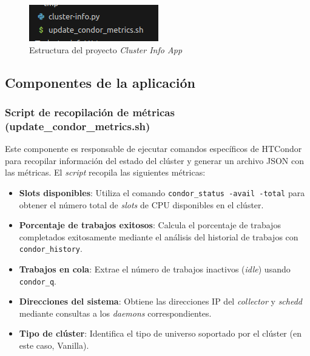 \begin{figure}[H]
	\centering
	\includegraphics[scale=0.7]{tablas-images/pmv/estructura-proyecto-cluster-info-app.png}
	\caption{Estructura del proyecto \textit{Cluster Info App}}
	\label{fig:estructura-proyecto-cluster-info-app}
\end{figure}

\subsection{Componentes de la aplicación}
\noindent

\subsubsection{Script de recopilación de métricas (update\_condor\_metrics.sh)}
\noindent

Este componente es responsable de ejecutar comandos específicos de HTCondor para recopilar información del estado del clúster y generar un archivo JSON con las métricas. El \textit{script} recopila las siguientes métricas:

\begin{itemize}
	\item \textbf{Slots disponibles}: Utiliza el comando \texttt{condor\_status -avail -total} para obtener el número total de \textit{slots} de CPU disponibles en el clúster.

	\item \textbf{Porcentaje de trabajos exitosos}: Calcula el porcentaje de trabajos completados exitosamente mediante el análisis del historial de trabajos con \texttt{condor\_history}.

	\item \textbf{Trabajos en cola}: Extrae el número de trabajos inactivos (\textit{idle}) usando \texttt{condor\_q}.

	\item \textbf{Direcciones del sistema}: Obtiene las direcciones IP del \textit{collector} y \textit{schedd} mediante consultas a los \textit{daemons} correspondientes.

	\item \textbf{Tipo de clúster}: Identifica el tipo de universo soportado por el clúster (en este caso, Vanilla).
\end{itemize}


